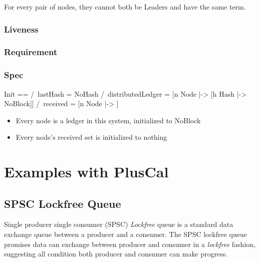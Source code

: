 \documentclass{report}
\begin{document}
For every pair of nodes, they cannot both be Leaders and have the same
term.

\section{Liveness}



\section{Requirement}

\section{Spec}

\begin{tla}
Init ==
    /\ lastHash = NoHash
    /\ distributedLedger = [n \in Node |-> [h \in Hash |-> NoBlock]]
    /\ received = [n \in Node |-> {}]
\end{tla}
\begin{tlatex}
%
%
%
\end{tlatex}
\newline

\begin{itemize}
    \item Every node is a ledger in this system, initialized to NoBlock
    \item Every node's received set is initialized to nothing
\end{itemize}

\part{Examples with PlusCal}

\chapter{SPSC Lockfree Queue}

Single producer single consumer (SPSC) \textit{Lockfree} queue is a standard
data exchange queue between a producer and a consumer. The SPSC lockfree queue
promises data can exchange between producer and consumer in a \textit{lockfree}
fashion, suggesting all condition both producer and consumer can make
progress.\newline
\end{document}
